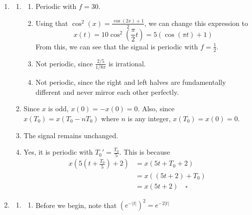 \documentclass[12pt]{article}
\begin{document}
\begin{enumerate}
\begin{enumerate}
            \end{enumerate}
      \item \begin{enumerate}
                  \item \begin{enumerate}
                              \item Periodic with $f=30$.
                              \item Using that $\cos^2(x)=\frac{\cos(2x)+1}{2}$, we can change this expression to
                                    \[x(t)=10\cos^2\left(\frac{\pi}{2}t\right)=5(\cos(\pi t)+1)\]
                                    From this, we can see that the signal is periodic with $f=\boxed{\frac{1}{2}}$.
                              \item Not periodic, since $\frac{2/5}{1/8\pi}$ is irrational.
                              \item Not periodic, since the right and left halves are fundamentally different and never mirror each other perfectly.
                        \end{enumerate}
                  \item Since $x$ is odd, $x(0)=-x(0)=0$.
                        Also, since $x(T_0)=x(T_0-nT_0)$ where $n$ is any integer, $x(T_0)=x(0)=\boxed{0}$.
                  \item The signal remains unchanged.
                  \item Yes, it is periodic with $T_0'=\frac{T_0}{5}$.
                        This is because
                        \begin{align*}
                              x\left(5\left(t+\frac{T_0}{5}\right)+2\right)
                               & = x(5t+T_0+2)         \\
                               & = x((5t+2)+T_0)       \\
                               & = x(5t+2)\quad\square
                        \end{align*}
            \end{enumerate}
      \item \begin{enumerate}
                  \item \begin{enumerate}
                              \item Before we begin, note that $\left(e^{-|t|}\right)^2=e^{-2|t|}$
                                    \begin{align*}

\end{align*}
\end{enumerate}
\end{enumerate}
\end{enumerate}
\end{document}
